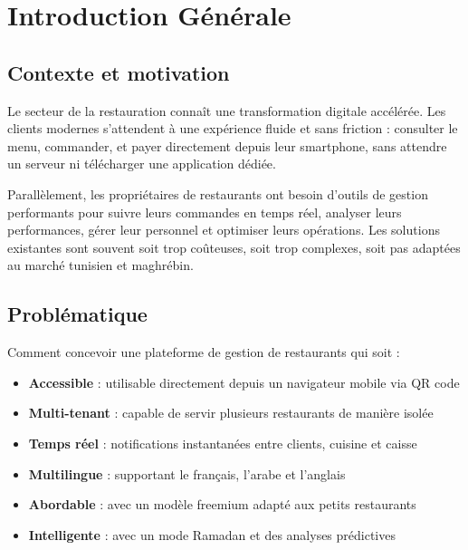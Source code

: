 \documentclass[12pt,a4paper]{report}
\begin{document}
\cleardoublepage

\chapter*{Introduction Générale}

\section*{Contexte et motivation}

Le secteur de la restauration connaît une transformation digitale accélérée. Les clients modernes s'attendent à une expérience fluide et sans friction : consulter le menu, commander, et payer directement depuis leur smartphone, sans attendre un serveur ni télécharger une application dédiée.

Parallèlement, les propriétaires de restaurants ont besoin d'outils de gestion performants pour suivre leurs commandes en temps réel, analyser leurs performances, gérer leur personnel et optimiser leurs opérations. Les solutions existantes sont souvent soit trop coûteuses, soit trop complexes, soit pas adaptées au marché tunisien et maghrébin.

\section*{Problématique}

Comment concevoir une plateforme de gestion de restaurants qui soit :
\begin{itemize}
    \item \textbf{Accessible} : utilisable directement depuis un navigateur mobile via QR code
    \item \textbf{Multi-tenant} : capable de servir plusieurs restaurants de manière isolée
    \item \textbf{Temps réel} : notifications instantanées entre clients, cuisine et caisse
    \item \textbf{Multilingue} : supportant le français, l'arabe et l'anglais
    \item \textbf{Abordable} : avec un modèle freemium adapté aux petits restaurants
    \item \textbf{Intelligente} : avec un mode Ramadan et des analyses prédictives
\end{itemize}
\end{document}
